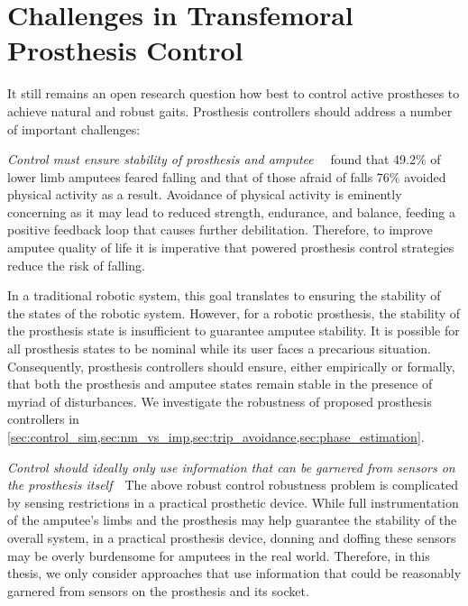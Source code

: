 \section{Challenges in Transfemoral Prosthesis
Control}\label{sec:intro_challenges} 

It still remains an open research question how best to control active prostheses
to achieve natural and robust gaits. Prosthesis controllers should address a
number of important challenges: 

\begin{challenges}
    \item\label{chal:robust} \emph{Control must ensure stability of prosthesis
    and amputee}~~\citet{miller2001prevalence} found that 49.2\% of lower
    limb amputees feared falling and that of those afraid of falls 76\% avoided
    physical activity as a result. Avoidance of physical activity is eminently
    concerning as it may lead to reduced strength, endurance, and balance,
    feeding a positive feedback loop that causes further debilitation.
    Therefore, to improve amputee quality of life it is imperative that powered
    prosthesis control strategies reduce the risk of falling. 
    
    In a traditional robotic system, this goal translates to ensuring the
    stability of the states of the robotic system. However, for a robotic
    prosthesis, the stability of the prosthesis state is insufficient to
    guarantee amputee stability. It is possible for all prosthesis states to be
    nominal while its user faces a precarious situation. Consequently,
    prosthesis controllers should ensure, either empirically or formally, that
    both the prosthesis and amputee states remain stable in the presence of
    myriad of disturbances. We investigate the robustness of proposed prosthesis
    controllers in
    \cref{sec:control_sim,sec:nm_vs_imp,sec:trip_avoidance,sec:phase_estimation}.
    
    \item\label{chal:sensing} \emph{Control should ideally only use information
    that can be garnered from sensors on the prosthesis itself}~~The above
    robust control robustness problem is complicated by sensing restrictions in
    a practical prosthetic device. While full instrumentation of the amputee's
    limbs and the prosthesis may help guarantee the stability of the overall
    system, in a practical prosthesis device, donning and doffing these sensors
    may be overly burdensome for amputees in the real world. Therefore, in this
    thesis, we only consider approaches that use information that could be
    reasonably garnered from sensors on the prosthesis and its socket.


\end{challenges}
